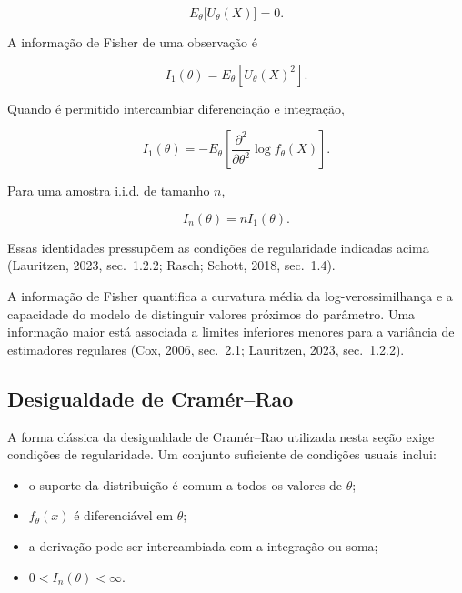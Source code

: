 \documentclass[
  letterpaper,
  DIV=11,
  numbers=noendperiod]{scrreprt}
\providecommand{\tightlist}{%
  \setlength{\itemsep}{0pt}\setlength{\parskip}{0pt}}\usepackage{longtable,booktabs,array}
\begin{document}
\[E_\theta\bigl[U_\theta(X)\bigr]=0.\]

\begin{tcolorbox}[enhanced jigsaw, colback=white, leftrule=.75mm, colbacktitle=quarto-callout-tip-color!10!white, breakable, titlerule=0mm, bottomtitle=1mm, title=\textcolor{quarto-callout-tip-color}{\faLightbulb}\hspace{0.5em}{Definição: informação de Fisher}, colframe=quarto-callout-tip-color-frame, toprule=.15mm, opacityback=0, bottomrule=.15mm, opacitybacktitle=0.6, arc=.35mm, toptitle=1mm, rightrule=.15mm, coltitle=black, left=2mm]

A informação de Fisher de uma observação é

\[I_1(\theta)
=
E_\theta\left[U_\theta(X)^2\right].\]

Quando é permitido intercambiar diferenciação e integração,

\[I_1(\theta)
=
-E_\theta\left[
\frac{\partial^2}{\partial\theta^2}
\log f_\theta(X)
\right].\]

Para uma amostra i.i.d. de tamanho \(n\),

\[I_n(\theta)=nI_1(\theta).\]

Essas identidades pressupõem as condições de regularidade indicadas
acima (Lauritzen, 2023, sec.~1.2.2; Rasch; Schott, 2018, sec.~1.4).

\end{tcolorbox}

A informação de Fisher quantifica a curvatura média da
log-verossimilhança e a capacidade do modelo de distinguir valores
próximos do parâmetro. Uma informação maior está associada a limites
inferiores menores para a variância de estimadores regulares (Cox, 2006,
sec.~2.1; Lauritzen, 2023, sec.~1.2.2).

\subsection*{Desigualdade de
Cramér--Rao}\label{desigualdade-de-cramuxe9rrao}

A forma clássica da desigualdade de Cramér--Rao utilizada nesta seção
exige condições de regularidade. Um conjunto suficiente de condições
usuais inclui:

\begin{itemize}
\tightlist
\item
  o suporte da distribuição é comum a todos os valores de \(\theta\);
\item
  \(f_\theta(x)\) é diferenciável em \(\theta\);
\item
  a derivação pode ser intercambiada com a integração ou soma;
\item
  \(0<I_n(\theta)<\infty\).
\end{itemize}
\end{document}
